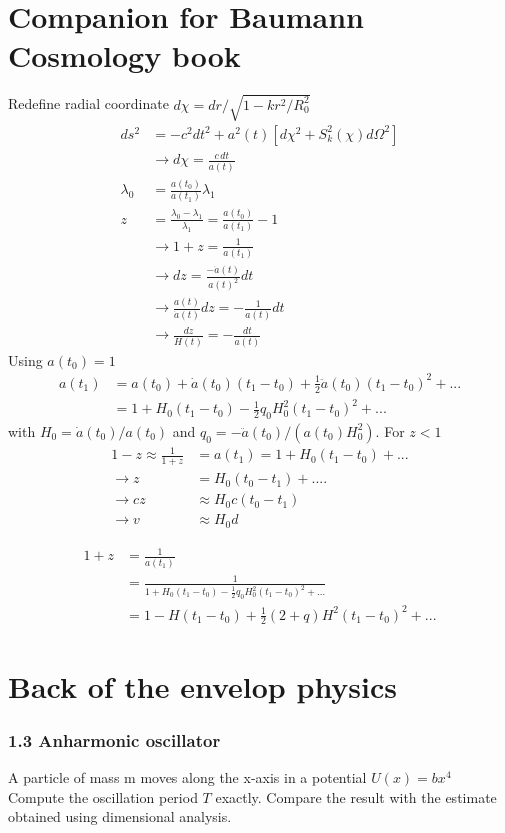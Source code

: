 \documentclass[10pt,a4paper]{book}
\theoremstyle{definition}
\begin{document}
\chapter{Companion for Baumann Cosmology book}
Redefine radial coordinate $d\chi=dr/\sqrt{1-kr^2/R_0^2}$
\begin{align}
ds^2&=-c^2dt^2+a^2(t)[d\chi^2+S_k^2(\chi)d\Omega^2]\\
&\rightarrow d\chi=\frac{c\,dt}{a(t)}\\
\lambda_0&=\frac{a(t_0)}{a(t_1)}\lambda_1\\
z&=\frac{\lambda_0-\lambda_1}{\lambda_1}=\frac{a(t_0)}{a(t_1)}-1\\
&\rightarrow1+z=\frac{1}{a(t_1)}\\
&\rightarrow dz=\frac{-\dot{a}(t)}{a(t)^2}dt\\
&\rightarrow \frac{a(t)}{\dot{a}(t)}dz=-\frac{1}{a(t)}dt\\
&\rightarrow \frac{dz}{H(t)}=-\frac{dt}{a(t)}
\end{align}
Using $a(t_0)=1$
\begin{align}
a(t_1)&=a(t_0)+\dot{a}(t_0)(t_1-t_0)+\frac{1}{2}\ddot{a}(t_0)(t_1-t_0)^2+...\\
&=1+H_0(t_1-t_0)-\frac{1}{2}q_0H_0^2(t_1-t_0)^2+...
\end{align}
with $H_0=\dot{a}(t_0)/a(t_0)$ and $q_0=-\ddot{a}(t_0)/(a(t_0)H_0^2)$. For $z<1$
\begin{align}
1-z\approx\frac{1}{1+z}&=a(t_1)=1+H_0(t_1-t_0)+...\\
\rightarrow z&=H_0(t_0-t_1)+....\\
\rightarrow cz&\approx H_0c(t_0-t_1)\\
\rightarrow v&\approx H_0d
\end{align}

\begin{align}
1+z&=\frac{1}{a(t_1)}\\
&=\frac{1}{1+H_0(t_1-t_0)-\frac{1}{2}q_0H_0^2(t_1-t_0)^2+...}\\
&=1-H(t_1-t_0)+\frac{1}{2}(2+q)H^2(t_1-t_0)^2+...
\end{align}

\chapter{Back of the envelop physics}

\subsection{1.3 Anharmonic oscillator}
A particle of mass m moves along the x-axis in a potential $U(x) = bx^4$
Compute the oscillation period $T$ exactly. Compare the result with the estimate obtained using dimensional analysis.
\end{document}
